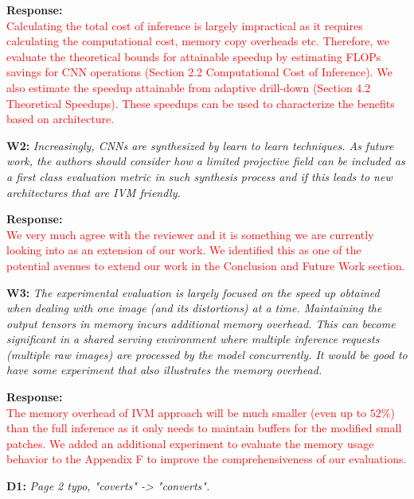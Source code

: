 \documentclass[preprint]{vldb}
\newcommand{\red}{\textcolor{red}}
\begin{document}
\vspace{2mm}
\noindent \textbf{Response:}\\
\red{Calculating the total cost of inference is largely impractical as it requires calculating the computational cost, memory copy overheads etc. Therefore, we evaluate the theoretical bounds for attainable speedup by estimating FLOPs savings for CNN operations (Section 2.2 Computational Cost of Inference). We also estimate the speedup attainable from adaptive drill-down (Section 4.2 Theoretical Speedups). These speedups can be used to characterize the benefits based on architecture.
}

\vspace{2mm}
\noindent \textbf{W2:} \textit{ Increasingly, CNNs are synthesized by learn to learn techniques. As future work, the authors should consider how a limited projective field can be included as a first class evaluation metric in such synthesis process and if this leads to new architectures that are IVM friendly.}

\vspace{2mm}
\noindent \textbf{Response:}\\
\red{We very much agree with the reviewer and it is something we are currently looking into as an extension of our work.
We identified this as one of the potential avenues to extend our work in the Conclusion and Future Work section.}

\vspace{2mm}
\noindent \textbf{W3:} \textit{ The experimental evaluation is largely focused on the speed up obtained when dealing with one image (and its distortions) at a time. Maintaining the output tensors in memory incurs additional memory overhead. This can become significant in a shared serving environment where multiple inference requests (multiple raw images) are processed by the model concurrently. It would be good to have some experiment that also illustrates the memory overhead.}

\vspace{2mm}
\noindent \textbf{Response:}\\
\red{The memory overhead of IVM approach will be much smaller (even up to $52\%$) than the full inference as it only needs to maintain buffers for the modified small patches. We added an additional experiment to evaluate the memory usage behavior to the Appendix F to improve the comprehensiveness of our evaluations.}

\vspace{2mm}
\noindent \textbf{D1:} \textit{ Page 2 typo, "coverts" -> "converts".}
\end{document}
